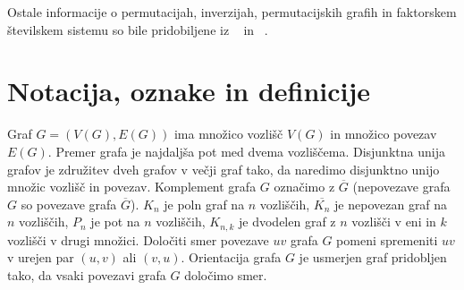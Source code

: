 \documentclass[a4paper, 12pt]{book}
\begin{document}
Ostale informacije o permutacijah, inverzijah, permutacijskih grafih in faktorskem številskem sistemu so bile pridobiljene iz ~\cite{dsSkripta} in ~\cite{factorialNumberSystem}.



\section{ Notacija, oznake in definicije }

Graf $G = (V(G), E(G))$ ima množico vozlišč $V(G)$ in množico povezav $E(G)$. Premer grafa je najdaljša pot med dvema vozliščema. Disjunktna unija grafov je združitev dveh grafov v večji graf tako, da naredimo disjunktno unijo množic vozlišč in povezav. Komplement grafa $G$ označimo z $\overline{G}$ (nepovezave grafa $G$ so povezave grafa $\overline{G}$). $K_n$ je poln graf na $n$ vozliščih, $\overline{K_n}$ je nepovezan graf na $n$ vozliščih, $P_n$ je pot na $n$ vozliščih, $K_{n, k}$ je dvodelen graf z $n$ vozlišči v eni in $k$ vozlišči v drugi množici. Določiti smer povezave $uv$ grafa $G$ pomeni spremeniti $uv$ v urejen par $(u, v)$ ali $(v, u)$. Orientacija grafa $G$ je usmerjen graf pridobljen tako, da vsaki povezavi grafa $G$ določimo smer.
\end{document}
